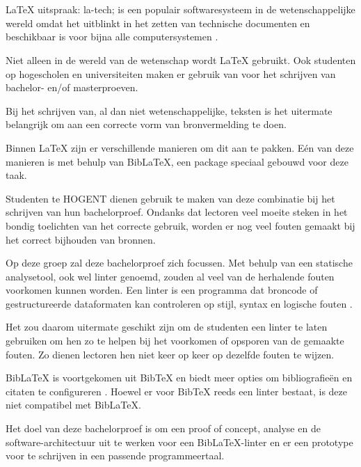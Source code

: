 
\chapter{}%
\label{ch:inleiding}
\LaTeX{} uitspraak: la-tech; is een populair softwaresysteem in de wetenschappelijke wereld omdat het uitblinkt in het zetten van technische documenten
en beschikbaar is voor bijna alle computersystemen \autocite{Oetiker2023}.

Niet alleen in de wereld van de wetenschap wordt \LaTeX{} gebruikt. Ook studenten op hogescholen en universiteiten maken er gebruik van voor het schrijven van bachelor- en/of masterproeven.

Bij het schrijven van, al dan niet wetenschappelijke, teksten is het uitermate belangrijk om aan een correcte vorm van bronvermelding te doen.

Binnen \LaTeX{} zijn er verschillende manieren om dit aan te pakken. Eén van deze manieren is met behulp van BibLaTeX, een package speciaal gebouwd voor deze taak.

Studenten te HOGENT dienen gebruik te maken van deze combinatie bij het schrijven van hun bachelorproef. Ondanks dat lectoren veel moeite steken in het bondig toelichten van het correcte gebruik, worden er nog veel fouten gemaakt bij het correct bijhouden van bronnen. 

Op deze groep zal deze bachelorproef zich focussen. Met behulp van een statische analysetool, ook wel linter genoemd, zouden al veel van de herhalende fouten voorkomen kunnen worden. Een linter is een programma dat broncode of gestructureerde dataformaten kan controleren op stijl, syntax en logische fouten \autocite{Kamunya2023}.

Het zou daarom uitermate geschikt zijn om de studenten een linter te laten gebruiken om hen zo te helpen bij het voorkomen of opsporen van de gemaakte fouten. Zo dienen lectoren hen niet keer op keer op dezelfde fouten te wijzen.

BibLaTeX is voortgekomen uit BibTeX en biedt meer opties om bibliografieën en citaten te configureren \autocite{Cassidy2013}. Hoewel er voor BibTeX reeds een linter bestaat, is deze niet compatibel met BibLaTeX.

Het doel van deze bachelorproef is om een proof of concept, analyse en de software-architectuur uit te werken voor een BibLaTeX-linter en er een prototype voor te schrijven in een passende programmeertaal. 

